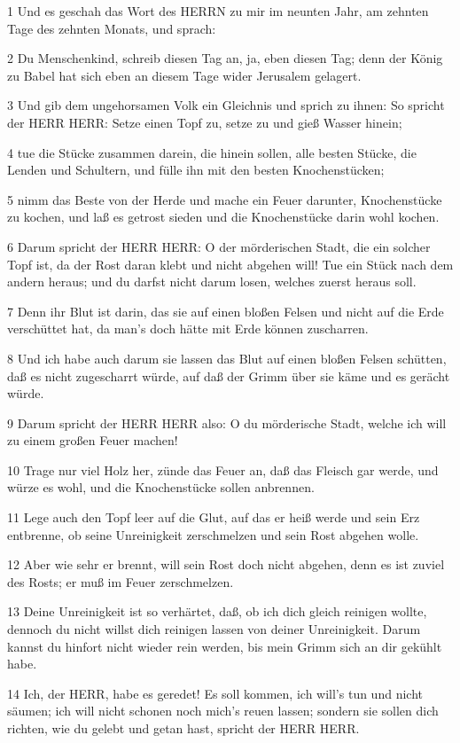 \par 1 Und es geschah das Wort des HERRN zu mir im neunten Jahr, am zehnten Tage des zehnten Monats, und sprach:
\par 2 Du Menschenkind, schreib diesen Tag an, ja, eben diesen Tag; denn der König zu Babel hat sich eben an diesem Tage wider Jerusalem gelagert.
\par 3 Und gib dem ungehorsamen Volk ein Gleichnis und sprich zu ihnen: So spricht der HERR HERR: Setze einen Topf zu, setze zu und gieß Wasser hinein;
\par 4 tue die Stücke zusammen darein, die hinein sollen, alle besten Stücke, die Lenden und Schultern, und fülle ihn mit den besten Knochenstücken;
\par 5 nimm das Beste von der Herde und mache ein Feuer darunter, Knochenstücke zu kochen, und laß es getrost sieden und die Knochenstücke darin wohl kochen.
\par 6 Darum spricht der HERR HERR: O der mörderischen Stadt, die ein solcher Topf ist, da der Rost daran klebt und nicht abgehen will! Tue ein Stück nach dem andern heraus; und du darfst nicht darum losen, welches zuerst heraus soll.
\par 7 Denn ihr Blut ist darin, das sie auf einen bloßen Felsen und nicht auf die Erde verschüttet hat, da man's doch hätte mit Erde können zuscharren.
\par 8 Und ich habe auch darum sie lassen das Blut auf einen bloßen Felsen schütten, daß es nicht zugescharrt würde, auf daß der Grimm über sie käme und es gerächt würde.
\par 9 Darum spricht der HERR HERR also: O du mörderische Stadt, welche ich will zu einem großen Feuer machen!
\par 10 Trage nur viel Holz her, zünde das Feuer an, daß das Fleisch gar werde, und würze es wohl, und die Knochenstücke sollen anbrennen.
\par 11 Lege auch den Topf leer auf die Glut, auf das er heiß werde und sein Erz entbrenne, ob seine Unreinigkeit zerschmelzen und sein Rost abgehen wolle.
\par 12 Aber wie sehr er brennt, will sein Rost doch nicht abgehen, denn es ist zuviel des Rosts; er muß im Feuer zerschmelzen.
\par 13 Deine Unreinigkeit ist so verhärtet, daß, ob ich dich gleich reinigen wollte, dennoch du nicht willst dich reinigen lassen von deiner Unreinigkeit. Darum kannst du hinfort nicht wieder rein werden, bis mein Grimm sich an dir gekühlt habe.
\par 14 Ich, der HERR, habe es geredet! Es soll kommen, ich will's tun und nicht säumen; ich will nicht schonen noch mich's reuen lassen; sondern sie sollen dich richten, wie du gelebt und getan hast, spricht der HERR HERR.
